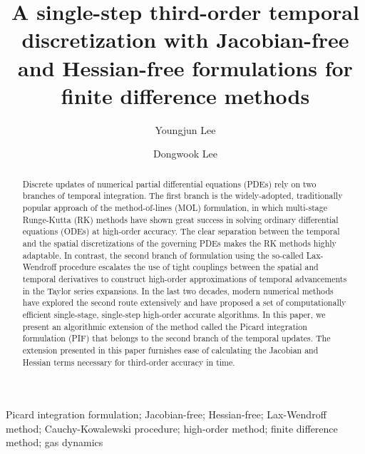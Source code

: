 \documentclass[times,preprint,3p]{elsarticle}
\begin{document}
\begin{frontmatter}

\title{A single-step third-order temporal discretization with
Jacobian-free and Hessian-free formulations for finite difference methods}


\author[1]{Youngjun {Lee}}
\author[1]{Dongwook {Lee}}

\address[1]{Department of Applied Mathematics, The University of California, Santa Cruz, CA, United States}

\begin{abstract}
Discrete updates of numerical partial differential equations (PDEs)
rely on two branches of temporal integration.
The first branch is the widely-adopted, traditionally popular
approach of the method-of-lines (MOL) formulation,
in which multi-stage Runge-Kutta (RK) methods have shown
great success in solving ordinary differential equations (ODEs)
at high-order accuracy. The clear separation between the temporal
and the spatial discretizations of the governing PDEs makes the
RK methods highly adaptable. In contrast, the second branch of
formulation using the so-called Lax-Wendroff procedure
escalates the use of tight couplings between the spatial
and temporal derivatives to construct high-order approximations
of temporal advancements in the Taylor series expansions.
In the last two decades, modern numerical methods have
explored the second route extensively and have proposed
a set of computationally efficient single-stage, single-step
high-order accurate algorithms. In this paper, we present
an algorithmic extension of the method called the
Picard integration formulation (PIF) that belongs to the
second branch of the temporal updates.
The extension presented in this paper furnishes ease of
calculating the Jacobian and Hessian terms necessary
for third-order accuracy in time.
\end{abstract}

\begin{keyword}
    Picard integration formulation;  
    Jacobian-free;
    Hessian-free;
    Lax-Wendroff method;
    Cauchy-Kowalewski procedure;
    high-order method;
    finite difference method;
    gas dynamics
\end{keyword}
\end{frontmatter}
%
%
%
%
\end{document}
